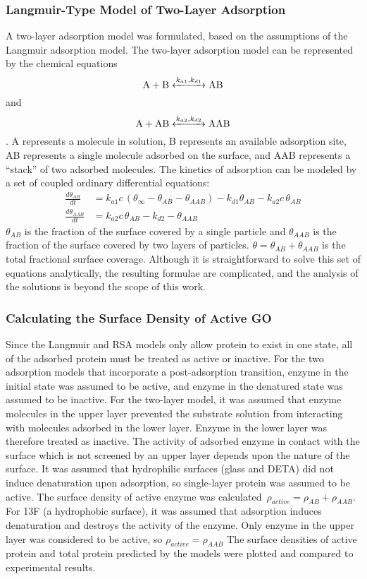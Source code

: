 \subsubsection{Langmuir-Type Model of Two-Layer Adsorption}

A two-layer adsorption model was formulated, based on the assumptions
of the Langmuir adsorption model. The two-layer adsorption model can
be represented by the chemical equations \[ \cee{A + B <->[k_{a1},k_{d1}] AB} \]
and \[ \cee{A + AB <->[k_{a2},k_{d2}] AAB} \]. A represents a molecule
in solution, B represents an available adsorption site, AB represents
a single molecule adsorbed on the surface, and AAB represents a {}``stack''
of two adsorbed molecules. The kinetics of adsorption can be modeled
by a set of coupled ordinary differential equations:\begin{align}
\frac{d\theta_{AB}}{dt} & =k_{a1}c\,\left(\theta_{\infty}-\theta_{AB}-\theta_{AAB}\right)-k_{d1}\theta_{AB}-k_{a2}c\,\theta_{AB}\label{eq:Two Layer AB}\\
\frac{d\theta_{AAB}}{dt} & =k_{a2}c\,\theta_{AB}-k_{d2}-\theta_{AAB}\label{eq:Two Layer AAB}\end{align}
$\theta_{AB}$ is the fraction of the surface covered by a single
particle and $\theta_{AAB}$ is the fraction of the surface covered
by two layers of particles. $\theta=\theta_{AB}+\theta_{AAB}$ is
the total fractional surface coverage. Although it is straightforward
to solve this set of equations analytically, the resulting formulae
are complicated, and the analysis of the solutions is beyond the scope
of this work. 


\subsubsection{Calculating the Surface Density of Active GO }

Since the Langmuir and RSA models only allow protein to exist in one
state, all of the adsorbed protein must be treated as active or inactive.
For the two adsorption models that incorporate a post-adsorption transition,
enzyme in the initial state was assumed to be active, and enzyme in
the denatured state was assumed to be inactive. For the two-layer
model, it was assumed that enzyme molecules in the upper layer prevented
the substrate solution from interacting with molecules adsorbed in
the lower layer. Enzyme in the lower layer was therefore treated as
inactive. The activity of adsorbed enzyme in contact with the surface
which is not screened by an upper layer depends upon the nature of
the surface. It was assumed that hydrophilic surfaces (glass and DETA)
did not induce denaturation upon adsorption, so single-layer protein
was assumed to be active. The surface density of active enzyme was
calculated~$\rho_{active}=\rho_{AB}+\rho_{AAB}$. For 13F (a hydrophobic
surface), it was assumed that adsorption induces denaturation and
destroys the activity of the enzyme. Only enzyme in the upper layer
was considered to be active, so $\rho_{active}=\rho_{AAB}$ The surface
densities of active protein and total protein predicted by the models
were plotted and compared to experimental results. 


